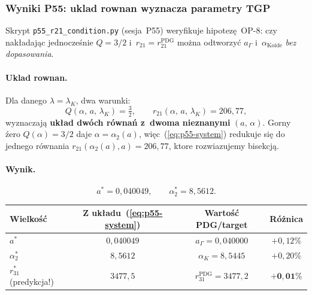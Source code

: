 \subsubsection{Wyniki P55: uklad rownan wyznacza parametry TGP}%
\label{app:F-P55}

Skrypt \texttt{p55\_r21\_condition.py} (sesja~P55) weryfikuje hipotez\k{e}~OP-8:
czy nak\l{}adaj\k{a}c jednocze\'snie $Q=3/2$ i~$r_{21}=r_{21}^{\mathrm{PDG}}$
mo\.zna odtworzy\'c $a_\Gamma$ i~$\alpha_\mathrm{Koide}$ \emph{bez dopasowania}.

\paragraph{Uklad rownan.}
Dla danego $\lambda=\lambda_K$, dwa warunki:
\begin{equation}\label{eq:p55-system}
  Q(\alpha,\,a,\,\lambda_K) = \tfrac{3}{2},
  \qquad
  r_{21}(\alpha,\,a,\,\lambda_K) = 206{,}77,
\end{equation}
wyznaczaj\k{a} \textbf{uk\l{}ad dw\'och r\'owna\'n z~dwoma nieznanymi}
$(a,\,\alpha)$.
Gorny \'zero $Q(\alpha)=3/2$ daje $\alpha=\alpha_2(a)$, wi\k{e}c~(\ref{eq:p55-system})
redukuje si\k{e} do jednego r\'ownania $r_{21}(\alpha_2(a),a)=206{,}77$,
ktore rozwiazujemy bisekcj\k{a}.

\paragraph{Wynik.}
\begin{equation}\label{eq:p55-result}
  a^* = 0{,}040049,\qquad \alpha_2^* = 8{,}5612.
\end{equation}

\begin{center}
\begin{tabular}{lccc}
\toprule
Wielko\'s\'c & Z uk\l{}adu~(\ref{eq:p55-system}) & Warto\'s\'c PDG/target & R\'o\.znica\\\midrule
$a^*$                   & $0{,}040049$ & $a_\Gamma=0{,}040000$ & $+0{,}12\%$ \\
$\alpha_2^*$            & $8{,}5612$   & $\alpha_K=8{,}5445$   & $+0{,}20\%$ \\
$r_{31}^*$ (predykcja!) & $3477{,}5$   & $r_{31}^{\mathrm{PDG}}=3477{,}2$ & $\mathbf{+0{,}01\%}$\\\bottomrule
\end{tabular}
\end{center}


